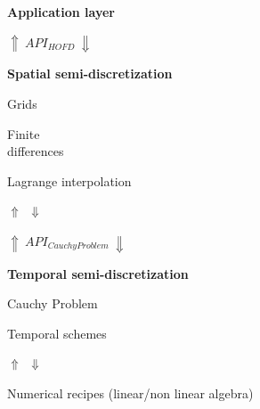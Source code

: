 \begin{framed}

\begin{framed}
\centering 
{\Large \textbf{Application layer}}


\end{framed}

\begin{multicols}{2}
\centering
$\Uparrow \:API_{HOFD}\: \Downarrow$

\begin{framed}

\textbf{Spatial semi-discretization}

\begin{multicols}{2}
\begin{framed}
Grids\\
\end{framed}

\columnbreak

\begin{framed}
{{Finite\\ differences}}
\end{framed}

\end{multicols}

\begin{framed}
Lagrange interpolation
\end{framed}

\end{framed}

\centering
$\Uparrow \:\: \Downarrow$

\columnbreak 

\centering
$\Uparrow \:API_{Cauchy Problem}\: \Downarrow$

\begin{framed}
\textbf{Temporal semi-discretization}

\begin{framed}
Cauchy Problem
\end{framed}
\vspace{0.3cm}

\begin{framed}
Temporal schemes\\
\end{framed}

\end{framed}
\centering
$\Uparrow \:\: \Downarrow$


\end{multicols}

\begin{framed}
\centering Numerical recipes (linear/non linear algebra)
\end{framed}

\end{framed}

